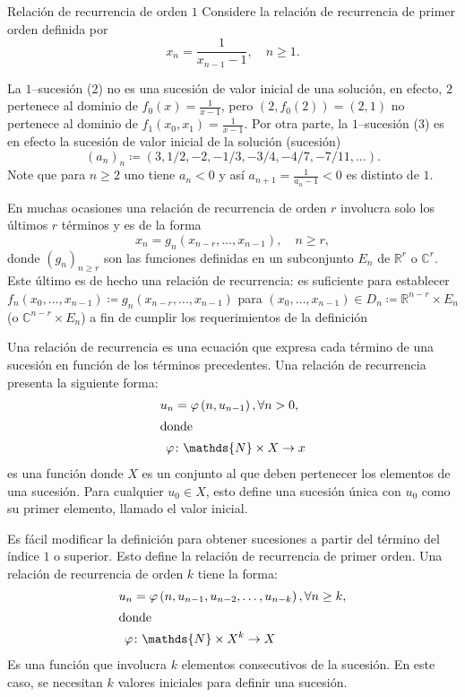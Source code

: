 \begin{example}{Relación de recurrencia de orden $1$}
	Considere la relación de recurrencia de primer orden definida por \[x_{n}=\frac{1}{x_{n-1}-1},\quad n\geq1.\]
\end{example}

La $1$--sucesión (2) no es una sucesión de valor inicial de una solución, en efecto, $2$ pertenece al dominio de $f_{0}\left(x\right)=\frac{1}{x-1}$, pero $\left(2,f_{0}(2)\right)=\left(2,1\right)$ no pertenece al dominio de $f_{1}\left(x_{0},x_{1}\right)=\frac{1}{x-1}$. Por otra parte, la $1$--sucesión (3) es en efecto la sucesión de valor inicial de la solución (sucesión) \[\left(a_{n}\right)_{n}\coloneqq\left(3,1/2,-2,-1/3,-3/4,-4/7,-7/11,\ldots\right).\]
Note que para $n\geq2$ uno tiene $a_{n}<0$ y así $a_{n+1}=\frac{1}{a_{n}-1}<0$ es distinto de $1$.

\begin{example}{}
	En muchas ocasiones una relación de recurrencia de orden $r$ involucra solo los últimos $r$ términos y es de la forma
	\begin{equation*}
	x_{n}=g_{n}\left(x_{n-r},\ldots,x_{n-1}\right),\quad n\geq r,
	\end{equation*}
	donde ${\left(g_{n}\right)}_{n\geq r}$ son las funciones definidas en un subconjunto $E_{n}$ de $\mathds{R}^{r}$ o $\mathds{C}^{r}$. Este último es de hecho una relación de recurrencia: es suficiente para establecer $f_{n}\left(x_{0},\ldots,x_{n-1}\right)\coloneqq g_{n}\left(x_{n-r},\ldots,x_{n-1}\right)$ para $\left(x_{0},\ldots,x_{n-1}\right)\in D_{n}\coloneqq\mathds{R}^{n-r}\times E_{n}$ (o $\mathds{C}^{n-r}\times E_{n}$) a fin de cumplir los requerimientos de la definición %
\end{example}

Una relación de recurrencia es una ecuación que expresa cada término de una sucesión en función de los términos precedentes. Una relación de recurrencia presenta la siguiente forma:
\begin{align*}
u_{n}&=\varphi\left(n,u_{n-1}\right),\forall n>0,\\
\intertext{donde}
\varphi&\colon\mathds{N}\times X\rightarrow x
\end{align*}
es una función donde $X$ es un conjunto al que deben pertenecer los elementos de una sucesión. Para cualquier $u_{0}\in X$, esto define una sucesión única con $u_{0}$ como su primer elemento, llamado el valor inicial.

Es fácil modificar la definición para obtener sucesiones a partir del término del índice $1$ o superior. Esto define la relación de recurrencia de primer orden. Una relación de recurrencia de orden $k$ tiene la forma:
\begin{align*}
u_{n}&=\varphi\left(n,u_{n-1},u_{n-2},\ldots,u_{n-k}\right),\forall n\geq k,\\
\intertext{donde}
\varphi&\colon\mathds{N}\times X^{k}\rightarrow X
\end{align*}
Es una función que involucra $k$ elementos consecutivos de la sucesión. En este caso, se necesitan $k$ valores iniciales para definir una sucesión.
